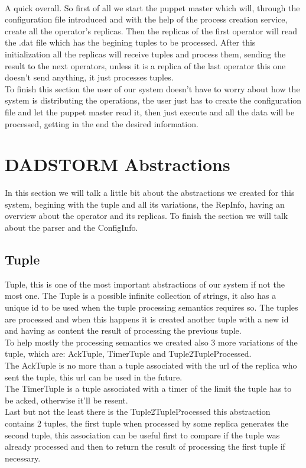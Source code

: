 \documentclass[times, 10pt, twocolumn]{article}
\begin{document}
\\A quick overall. So first of all we start the puppet master which will, through the configuration file introduced and with the help of the process creation service, create all the operator's replicas. Then the replicas of the first operator will read the .dat file which has the begining tuples to be processed. After this initialization all the replicas will receive tuples and process them, sending the result to the next operators, unless it is a replica of the last operator this one doesn't send anything, it just processes tuples.
\\To finish this section the user of our system doesn't have to worry about how the system is distributing the operations, the user just has to create the configuration file and let the puppet master read it, then just execute and all the data will be processed, getting in the end the desired information.



\section{DADSTORM Abstractions}
In this section we will talk a little bit about the abstractions we created for this system, begining with the tuple and all its variations, the RepInfo, having an overview about the operator and its replicas. To finish the section we will talk about the parser and the ConfigInfo.



\subsection{Tuple}
Tuple, this is one of the most important abstractions of our system if not the most one. The Tuple is a possible infinite collection of strings, it also has a unique id to be used when the tuple processing semantics requires so. The tuples are processed and when this happens it is created another tuple with a new id and having as content the result of processing the previous tuple. 
\\To help mostly the processing semantics we created also 3 more variations of the tuple, which are: AckTuple, TimerTuple and Tuple2TupleProcessed. 
\\The AckTuple is no more than a tuple associated with the url of the replica who sent the tuple, this url can be used in the future. 
\\The TimerTuple is a tuple associated with a timer of the limit the tuple has to be acked, otherwise it'll be resent. 
\\Last but not the least there is the Tuple2TupleProcessed this abstraction contains 2 tuples, the first tuple when processed by some replica generates the second tuple, this association can be useful first to compare if the tuple was already processed and then to return the result of processing the first tuple if necessary.
\end{document}
